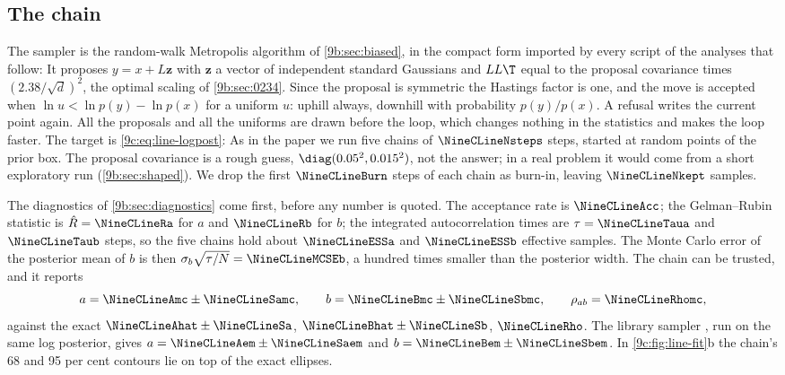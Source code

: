 \subsection{The chain}
\label{9c:sec:line-chain}

The sampler is the random-walk Metropolis algorithm of \cref{9b:sec:biased}, in the compact form
imported by every script of the analyses that follow:
It proposes $y=x+L\bm z$ with $\bm z$ a vector of independent standard Gaussians and $LL\T$ equal to
the proposal covariance times $(2.38/\sqrt d)^2$, the optimal scaling of \cref{9b:sec:0234}. Since
the proposal is symmetric the Hastings factor is one, and the move is accepted when
$\ln u<\ln p(y)-\ln p(x)$ for a uniform $u$: uphill always, downhill with probability
$p(y)/p(x)$. A refusal writes the current point again. All the proposals and all the uniforms are
drawn before the loop, which changes nothing in the statistics and makes the loop faster. The
target is \eqref{9c:eq:line-logpost}:
As in the paper we run five chains of $\NineCLineNsteps$ steps, started at random points of the
prior box. The proposal covariance is a rough guess, $\diag(0.05^2,0.015^2)$, not the answer; in a
real problem it would come from a short exploratory run (\cref{9b:sec:shaped}). We drop the first
$\NineCLineBurn$ steps of each chain as burn-in, leaving $\NineCLineNkept$ samples.

The diagnostics of \cref{9b:sec:diagnostics} come first, before any number is quoted. The acceptance
rate is $\NineCLineAcc$; the Gelman--Rubin statistic is $\hat R=\NineCLineRa$ for $a$ and
$\NineCLineRb$ for $b$; the integrated autocorrelation times are $\tau=\NineCLineTaua$ and
$\NineCLineTaub$ steps, so the five chains hold about $\NineCLineESSa$ and $\NineCLineESSb$
effective samples. The Monte Carlo error of the posterior mean of $b$ is then
$\sigma_b\sqrt{\tau/N}=\NineCLineMCSEb$, a hundred times smaller than the posterior width. The chain
can be trusted, and it reports
\[
  a=\NineCLineAmc\pm\NineCLineSamc,\qquad b=\NineCLineBmc\pm\NineCLineSbmc,\qquad \rho_{ab}=\NineCLineRhomc,
\]
against the exact $\NineCLineAhat\pm\NineCLineSa$, $\NineCLineBhat\pm\NineCLineSb$, $\NineCLineRho$. The
library sampler  \cite{ForemanMackey2013}, run on the same log posterior, gives
$a=\NineCLineAem\pm\NineCLineSaem$ and $b=\NineCLineBem\pm\NineCLineSbem$. In
\cref{9c:fig:line-fit}b the chain's 68 and 95 per cent contours lie on top of the exact ellipses.

